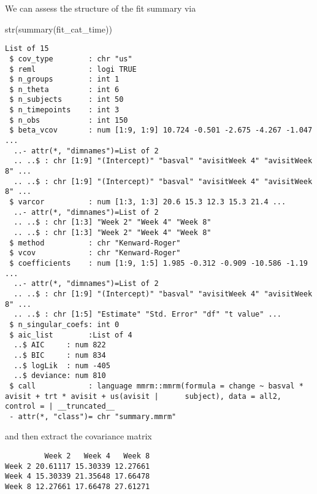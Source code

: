 \documentclass[
  letterpaper,
  DIV=11,
  numbers=noendperiod]{scrreprt}
\newenvironment{Shaded}{\begin{snugshade}}{\end{snugshade}}
\newcommand{\FunctionTok}[1]{\textcolor[rgb]{0.28,0.35,0.67}{#1}}
\newcommand{\NormalTok}[1]{\textcolor[rgb]{0.00,0.23,0.31}{#1}}
\newcommand{\SpecialCharTok}[1]{\textcolor[rgb]{0.37,0.37,0.37}{#1}}
\begin{document}
We can assess the structure of the fit summary via

\begin{Shaded}
\begin{Highlighting}[]
\FunctionTok{str}\NormalTok{(}\FunctionTok{summary}\NormalTok{(fit\_cat\_time))}
\end{Highlighting}
\end{Shaded}

\begin{verbatim}
List of 15
 $ cov_type        : chr "us"
 $ reml            : logi TRUE
 $ n_groups        : int 1
 $ n_theta         : int 6
 $ n_subjects      : int 50
 $ n_timepoints    : int 3
 $ n_obs           : int 150
 $ beta_vcov       : num [1:9, 1:9] 10.724 -0.501 -2.675 -4.267 -1.047 ...
  ..- attr(*, "dimnames")=List of 2
  .. ..$ : chr [1:9] "(Intercept)" "basval" "avisitWeek 4" "avisitWeek 8" ...
  .. ..$ : chr [1:9] "(Intercept)" "basval" "avisitWeek 4" "avisitWeek 8" ...
 $ varcor          : num [1:3, 1:3] 20.6 15.3 12.3 15.3 21.4 ...
  ..- attr(*, "dimnames")=List of 2
  .. ..$ : chr [1:3] "Week 2" "Week 4" "Week 8"
  .. ..$ : chr [1:3] "Week 2" "Week 4" "Week 8"
 $ method          : chr "Kenward-Roger"
 $ vcov            : chr "Kenward-Roger"
 $ coefficients    : num [1:9, 1:5] 1.985 -0.312 -0.909 -10.586 -1.19 ...
  ..- attr(*, "dimnames")=List of 2
  .. ..$ : chr [1:9] "(Intercept)" "basval" "avisitWeek 4" "avisitWeek 8" ...
  .. ..$ : chr [1:5] "Estimate" "Std. Error" "df" "t value" ...
 $ n_singular_coefs: int 0
 $ aic_list        :List of 4
  ..$ AIC     : num 822
  ..$ BIC     : num 834
  ..$ logLik  : num -405
  ..$ deviance: num 810
 $ call            : language mmrm::mmrm(formula = change ~ basval * avisit + trt * avisit + us(avisit |      subject), data = all2, control = | __truncated__
 - attr(*, "class")= chr "summary.mmrm"
\end{verbatim}

and then extract the covariance matrix

\begin{Shaded}
\end{Shaded}

\begin{verbatim}
         Week 2   Week 4   Week 8
Week 2 20.61117 15.30339 12.27661
Week 4 15.30339 21.35648 17.66478
Week 8 12.27661 17.66478 27.61271
\end{verbatim}
\end{document}
